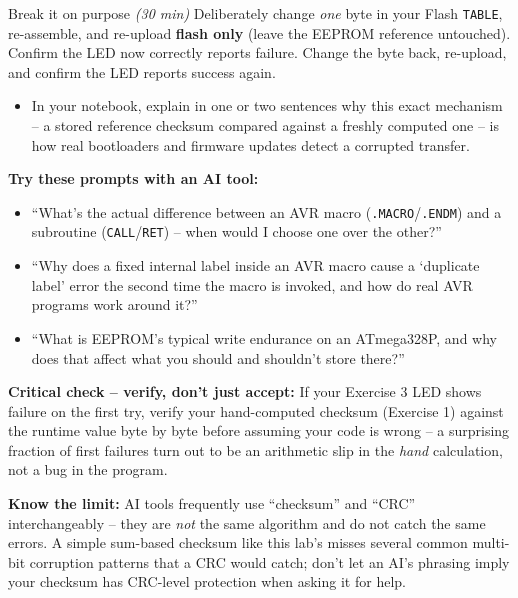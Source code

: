 \documentclass[11pt]{article}
\begin{document}
\begin{labexercise}{Break it on purpose \hfill {\small \itshape (30 min)}}
Deliberately change \emph{one} byte in your Flash \texttt{TABLE}, re-assemble,
and re-upload \textbf{flash only} (leave the EEPROM reference untouched). Confirm
the LED now correctly reports failure. Change the byte back, re-upload, and
confirm the LED reports success again.
\begin{itemize}[nosep,leftmargin=*]
  \item In your notebook, explain in one or two sentences why this exact
        mechanism -- a stored reference checksum compared against a freshly
        computed one -- is how real bootloaders and firmware updates detect a
        corrupted transfer.
\end{itemize}
\end{labexercise}

\begin{aicollab}
\textbf{Try these prompts with an AI tool:}
\begin{itemize}[leftmargin=*,nosep]
  \item ``What's the actual difference between an AVR macro
        (\texttt{.MACRO}/\texttt{.ENDM}) and a subroutine
        (\texttt{CALL}/\texttt{RET}) -- when would I choose one over the other?''
  \item ``Why does a fixed internal label inside an AVR macro cause a `duplicate
        label' error the second time the macro is invoked, and how do real AVR
        programs work around it?''
  \item ``What is EEPROM's typical write endurance on an ATmega328P, and why does
        that affect what you should and shouldn't store there?''
\end{itemize}

\medskip\textbf{Critical check -- verify, don't just accept:}
If your Exercise 3 LED shows failure on the first try, verify your hand-computed
checksum (Exercise 1) against the runtime value byte by byte before assuming your
code is wrong -- a surprising fraction of first failures turn out to be an
arithmetic slip in the \emph{hand} calculation, not a bug in the program.

\medskip\textbf{Know the limit:}
AI tools frequently use ``checksum'' and ``CRC'' interchangeably -- they are
\emph{not} the same algorithm and do not catch the same errors. A simple
sum-based checksum like this lab's misses several common multi-bit corruption
patterns that a CRC would catch; don't let an AI's phrasing imply your checksum
has CRC-level protection when asking it for help.
\end{aicollab}
\end{document}
